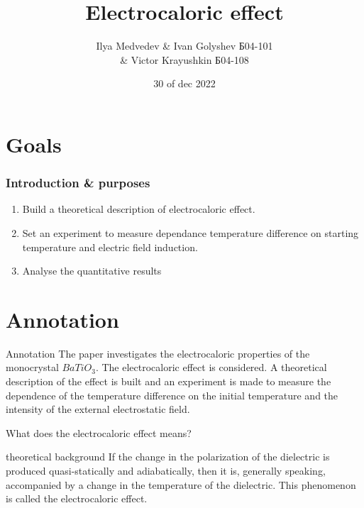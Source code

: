 \documentclass [xcolor=svgnames, t] {beamer}
\title[Electrocaloric effect
]{Electrocaloric effect
}
\author[Ilya Medvedev \& Ivan Golyshev  \& Victor Krayushkin]{
	Ilya Medvedev \& Ivan Golyshev Б04-101 \\
 \& Victor Krayushkin Б04-108 }
\institute[MIPT]{ \\
Moscow Institute of Physics \& Technology}
\date{30 of dec 2022}
\begin{document}

\begin{frame}
\maketitle
\end{frame}
\section{Goals}
\begin{frame}
\frametitle{Introduction \& purposes
}

\begin{enumerate} 
 \vspace{1.2cm}
    \item Build a theoretical description of electrocaloric effect.
\vspace{0.2cm}
    \item Set an experiment to measure dependance temperature difference on starting temperature and electric field induction.
\vspace{0.2cm}
    \item Analyse the quantitative results
\end{enumerate}
        
\end{frame}

\section{Annotation}
\begin{frame}{Annotation}
\vspace{1.2cm}
The paper investigates the electrocaloric properties of the monocrystal $BaTiO_3$. The electrocaloric effect is considered. A theoretical description of the effect is built and an experiment is made to measure the dependence of the temperature difference on the initial temperature and the intensity of the external electrostatic field.
\end{frame}

\begin{frame}{What does the electrocaloric effect means?}
\begin{block}{theoretical background}
If the change in the polarization of the dielectric is produced quasi-statically and adiabatically, then it is, generally speaking, accompanied by a change in the temperature of the dielectric. This phenomenon is called the electrocaloric effect.

\end{block}
\end{frame}
\end{document}
